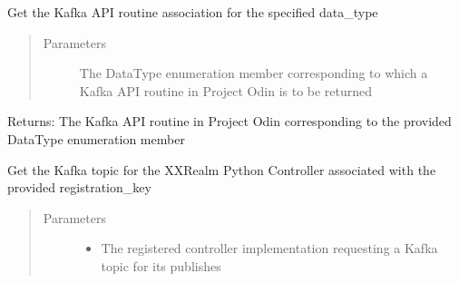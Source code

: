 \documentclass[letterpaper,10pt,english]{sphinxmanual}
\begin{document}
\begin{fulllineitems}
\begin{fulllineitems}
\end{fulllineitems}


\begin{fulllineitems}
\label{\detokenize{Realms:Realms.Realms.exposed_get_association}}
\sphinxAtStartPar
Get the Kafka API routine association for the specified data\_type
\begin{quote}\begin{description}
\item[{Parameters}] \leavevmode
\sphinxAtStartPar
{} \textendash{} The DataType enumeration member corresponding to which a Kafka API routine in Project Odin is
to be returned

\end{description}\end{quote}

\sphinxAtStartPar
Returns: The Kafka API routine in Project Odin corresponding to the provided DataType enumeration member

\end{fulllineitems}


\begin{fulllineitems}
\label{\detokenize{Realms:Realms.Realms.exposed_get_topic}}
\sphinxAtStartPar
Get the Kafka topic for the XXRealm Python Controller associated with the provided registration\_key
\begin{quote}\begin{description}
\item[{Parameters}] \leavevmode\begin{itemize}
\item {} 
\sphinxAtStartPar
{} \textendash{} The registered controller implementation requesting a Kafka topic for its publishes


\end{itemize}
\end{description}
\end{quote}
\end{fulllineitems}
\end{fulllineitems}
\end{document}
